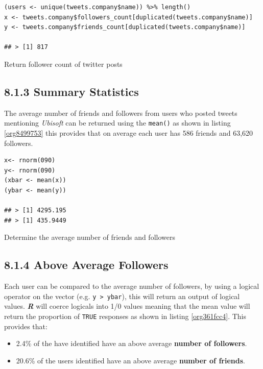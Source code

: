 \documentclass[11pt]{article}
\begin{document}
\begin{listing}[htbp]
\begin{verbatim}
(users <- unique(tweets.company$name)) %>% length()
x <- tweets.company$followers_count[duplicated(tweets.company$name)]
y <- tweets.company$friends_count[duplicated(tweets.company$name)]

## > [1] 817
\end{verbatim}
\caption{\label{orge0be59b}Return follower count of twitter posts}
\end{listing}


\subsection{8.1.3 Summary Statistics}
\label{sec:orgbcf0ca8}
The average number of friends and followers from users who posted tweets mentioning \emph{Ubisoft} can be returned using the \texttt{mean()} as shown in listing \ref{org8499753}
this provides that on average each user has 586 friends and 63,620 followers.

\begin{listing}[htbp]
\begin{verbatim}
x<- rnorm(090)
y<- rnorm(090)
(xbar <- mean(x))
(ybar <- mean(y))

## > [1] 4295.195
## > [1] 435.9449
\end{verbatim}
\caption{\label{org8499753}Determine the average number of friends and followers}
\end{listing}

\subsection{8.1.4 Above Average Followers}
\label{sec:orgfd8bb12}
Each user can be compared to the average number of followers, by using a logical
operator on the vector (e.g. \texttt{y > ybar}), this will return an output of logical
values. \textbf{\emph{R}} will coerce logicals into 1/0 values meaning that the mean value
will return the proportion of \texttt{TRUE} responses as shown in listing \ref{org361fcc4}. This
provides that:

\begin{itemize}
\item 2.4\%  of the have identified have an above average \textbf{number of followers}.
\item 20.6\% of the users identified have an above average \textbf{number of friends}.
\end{itemize}
\end{document}
